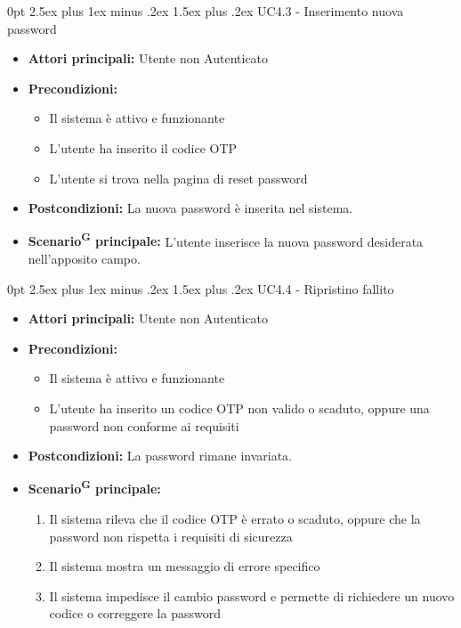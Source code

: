 \documentclass[a4paper, 11pt]{article}
\makeatletter
\renewcommand\paragraph{\@startsection{paragraph}{4}
  {0pt}
  {2.5ex plus 1ex minus .2ex}
  {1.5ex plus .2ex}
  {\normalfont\normalsize\bfseries\color{AccentDark}}}
\makeatother
\begin{document}
\paragraph{UC4.3 - Inserimento nuova password}\label{UC4.3}
\begin{itemize}
	\item \textbf{Attori principali:} Utente non Autenticato
	\item \textbf{Precondizioni:}
	\begin{itemize}
		\item Il sistema è attivo e funzionante
		\item L'utente ha inserito il codice OTP
		\item L'utente si trova nella pagina di reset password
	\end{itemize}
	\item \textbf{Postcondizioni:} La nuova password è inserita nel sistema.
	\item \textbf{Scenario\textsuperscript{G} principale:} L'utente inserisce la nuova password desiderata nell'apposito campo.
\end{itemize}

\paragraph{UC4.4 - Ripristino fallito}\label{UC4.4}
\begin{itemize}
	\item \textbf{Attori principali:} Utente non Autenticato
	\item \textbf{Precondizioni:}
	\begin{itemize}
		\item Il sistema è attivo e funzionante
		\item L'utente ha inserito un codice OTP non valido o scaduto, oppure una password non conforme ai requisiti
	\end{itemize}
	\item \textbf{Postcondizioni:} La password rimane invariata.
	\item \textbf{Scenario\textsuperscript{G} principale:}
	\begin{enumerate}
		\item Il sistema rileva che il codice OTP è errato o scaduto, oppure che la password non rispetta i requisiti di sicurezza
		\item Il sistema mostra un messaggio di errore specifico
		\item Il sistema impedisce il cambio password e permette di richiedere un nuovo codice o correggere la password
	\end{enumerate}
\end{itemize}
\end{document}
